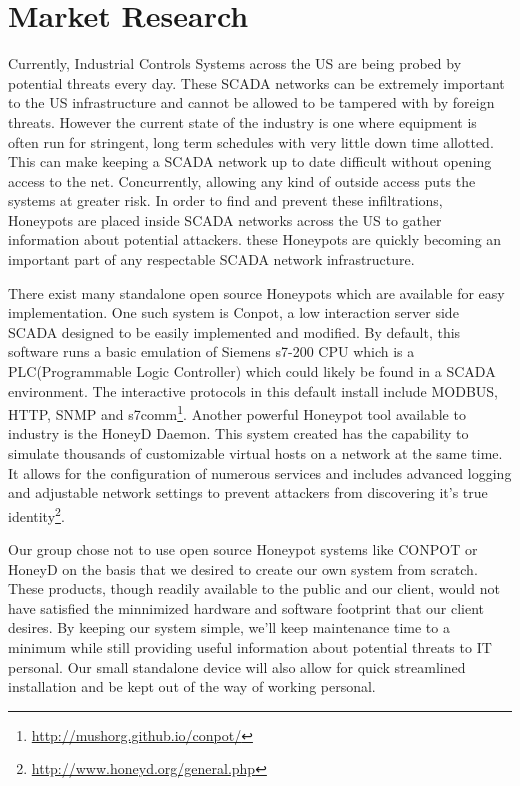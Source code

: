 \chapter{Market Research}

Currently, Industrial Controls Systems across the US are being probed by potential threats every day. These SCADA networks can be extremely important to the US infrastructure and cannot be allowed to be tampered with by foreign threats. However the current state of the industry is one where equipment is often run for stringent, long term schedules with very little down time allotted. This can make keeping a SCADA network up to date difficult without opening access to the net. Concurrently, allowing any kind of outside access puts the systems at greater risk. In order to find and prevent these infiltrations, Honeypots are placed inside SCADA networks across the US to gather information about potential attackers. these Honeypots are quickly becoming an important part of any respectable SCADA network infrastructure. 


There exist many standalone open source Honeypots which are available for easy implementation. One such system is Conpot, a low interaction server side SCADA designed to be easily implemented and modified. By default, this software runs a basic emulation of Siemens s7-200 CPU which is a PLC(Programmable Logic Controller) which could likely be found in a SCADA environment. The interactive protocols in this default install include MODBUS, HTTP, SNMP and s7comm\footnote{\url{http://mushorg.github.io/conpot/}}. Another powerful Honeypot tool available to industry is the HoneyD Daemon. This system created has the capability to simulate thousands of customizable virtual hosts on a network at the same time. It allows for the configuration of numerous services and includes advanced logging and adjustable network settings to prevent attackers from discovering it's true identity\footnote{\url{http://www.honeyd.org/general.php}}.


Our group chose not to use open source Honeypot systems like CONPOT  or HoneyD on the basis that we desired to create our own system from scratch. These products, though readily available to the public and our client, would not have satisfied the minnimized hardware and software footprint that our client desires. By keeping our system simple, we’ll keep maintenance time to a minimum while still providing useful information about potential threats to IT personal. Our small standalone device will also allow for quick streamlined installation and be kept out of the way of working personal. 
